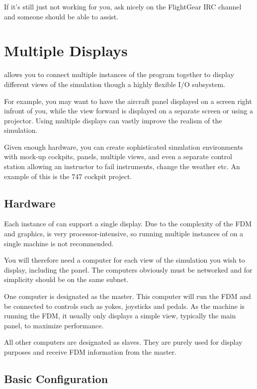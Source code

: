 If it's still just not working for you, ask nicely on the FlightGear IRC channel and someone should be able to assist. 


\section{Multiple Displays}

\FlightGear{} allows you to connect multiple instances of the program together
to display different views of the simulation though a highly flexible I/O
subsystem.

For example, you may want to have the aircraft panel displayed on a screen
right infront of you, while the view forward is displayed on a separate screen
or using a projector. Using multiple displays can vastly improve the realism
of the simulation.

Given enough hardware, you can create sophisticated simulation environments
with mock-up cockpits, panels, multiple views, and even a separate control
station allowing an
instructor to fail instruments, change the weather etc. An example of this is
the 747 cockpit project.


\noindent
{}

\subsection{Hardware}

Each instance of \FlightGear{} can support a single display. Due to the
complexity of the FDM and graphics, \FlightGear{} is very processor-intensive,
so running multiple instances of \FlightGear{} on a single machine is not
recommended.

You will therefore need a computer for each view of the simulation you wish
to display, including the panel. The computers obviously must be networked
and for simplicity should be on the same subnet.

One computer is designated as the master. This computer will run the FDM and
be connected to controls such as yokes, joysticks and pedals. As the machine is
running the FDM, it usually only displays a simple view, typically the main
panel, to maximize performance.

All other computers are designated as slaves. They are purely used for display
purposes and receive FDM information from the master.

\subsection{Basic Configuration}

